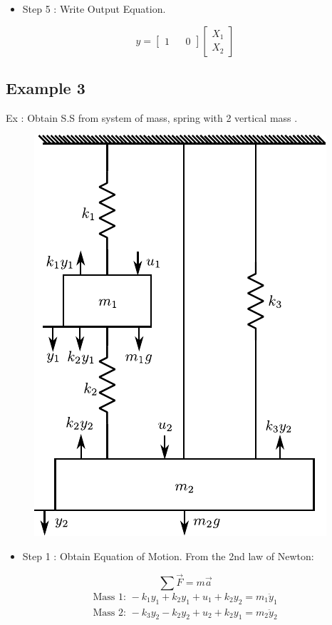 \documentclass[12pt,a4paper]{article}
\begin{document}
	\begin{itemize}
		\item Step 5 : Write Output Equation.
	\end{itemize}
	\[
	y =
	\begin{bmatrix}
		1 &   & 0 
	\end{bmatrix}
	\begin{bmatrix}
		X_1 \\
		X_2 
	\end{bmatrix}
	\]
	
	
	\subsection{Example 3}
	Ex : Obtain S.S from system of mass, spring with 2 vertical mass .
	\begin{figure}[]
		\centering
		\includegraphics[scale=1]{src/img2.pdf}
	\end{figure}
	\begin{itemize}
		\item Step 1 : Obtain Equation of Motion. From the 2nd law of Newton:
	\end{itemize}
	\[
	\sum \vec{F} = m\vec{a}
	\]
	\[
	\begin{split}
		\text{Mass 1: } -k_1y_1 + k_2y_1 + u_1 + k_2y_2 = m_1\ddot{y}_1 \\
		\text{Mass 2: } -k_3y_2 - k_2y_2 + u_2 + k_2y_1 = m_2\ddot{y}_2
	\end{split}
	\]
\end{document}
